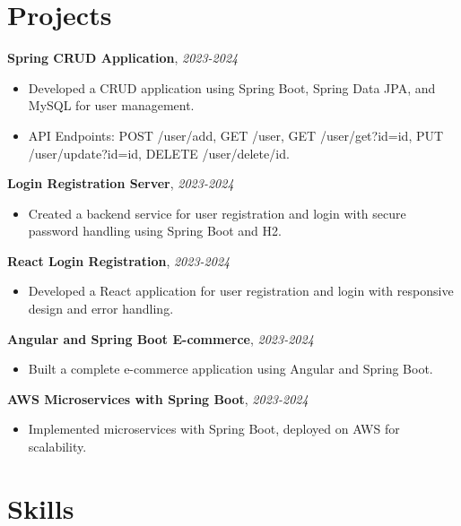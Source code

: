 \documentclass[10pt]{article}
\begin{document}
\section*{Projects}

\textbf{Spring CRUD Application}, \hfill \textit{2023-2024} \\
\begin{itemize}
    \item Developed a CRUD application using Spring Boot, Spring Data JPA, and MySQL for user management.
    \item API Endpoints: POST /user/add, GET /user, GET /user/get?id={id}, PUT /user/update?id={id}, DELETE /user/delete/{id}.
\end{itemize}

\textbf{Login Registration Server}, \hfill \textit{2023-2024} \\
\begin{itemize}
    \item Created a backend service for user registration and login with secure password handling using Spring Boot and H2.
\end{itemize}

\textbf{React Login Registration}, \hfill \textit{2023-2024} \\
\begin{itemize}
    \item Developed a React application for user registration and login with responsive design and error handling.
\end{itemize}

\textbf{Angular and Spring Boot E-commerce}, \hfill \textit{2023-2024} \\
\begin{itemize}
    \item Built a complete e-commerce application using Angular and Spring Boot.
\end{itemize}

\textbf{AWS Microservices with Spring Boot}, \hfill \textit{2023-2024} \\
\begin{itemize}
    \item Implemented microservices with Spring Boot, deployed on AWS for scalability.
\end{itemize}

\section*{Skills}
\end{document}

